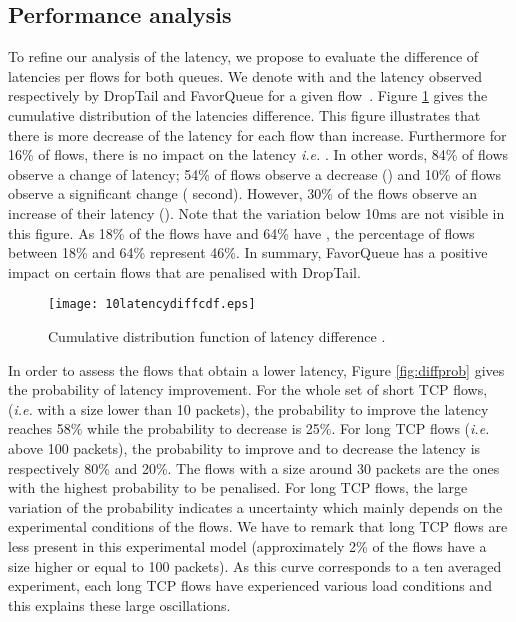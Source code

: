 \documentclass{elsart}
\begin{document}
\subsection{Performance analysis}

To refine our analysis of the latency, we propose to evaluate the difference of latencies per flows for both queues. We denote  with  and  the latency observed respectively by DropTail and FavorQueue for a given flow~. Figure \ref{fig:diffcdf} gives the cumulative distribution of the latencies difference.
This figure illustrates that there is more decrease of the latency for each flow than increase. Furthermore for 16\% of flows, there is no impact on the latency \textit{i.e.} . In other words, 84\% of flows observe 
a change of latency; 54\% of flows observe a decrease () and 10\% of flows observe a significant change ( second). However, 30\% of the flows observe an increase of their latency ().
Note that the variation below 10ms are not visible in this figure. As 18\% of the flows have  and 64\% have , the percentage of flows between  18\% and 64\% represent 46\%.
In summary, FavorQueue has a positive impact on certain flows that are penalised with DropTail.


\begin{figure}[ht]
\begin{center}
\texttt{[image: 10latencydiffcdf.eps]}
\end{center}
\caption{Cumulative distribution function of latency difference .}
\label{fig:diffcdf}
\end{figure}

In order to assess the flows that obtain a lower latency, Figure \ref{fig:diffprob} gives the probability of latency improvement. 
For the whole set of short TCP flows, (\textit{i.e.} with a size lower than 10 packets), the probability to improve the latency reaches 58\% while the probability to decrease is 25\%. For long TCP flows (\textit{i.e.} above 100 packets), 
the probability to improve and to decrease the latency is respectively 80\% and 20\%.
The flows with a size around 30 packets are the ones with the highest probability to be penalised. 
For long TCP flows, the large variation of the probability indicates a uncertainty which mainly depends on the experimental conditions of the flows.
We have to remark that long TCP flows are less present in this experimental model (approximately 2\% of the flows have a size higher or equal to 100 packets). As this curve corresponds to a ten averaged experiment, 
each long TCP flows have experienced various load conditions and this explains these large oscillations. 
\end{document}
